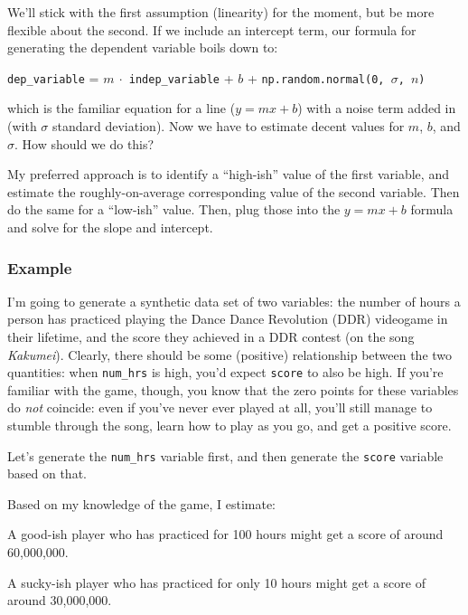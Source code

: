 We'll stick with the first assumption (linearity) for the moment, but be more
flexible about the second. If we include an intercept term, our formula for
generating the dependent variable boils down to:

\begin{center}
\texttt{dep\_variable} = $m \ \cdot$ \texttt{indep\_variable}
+ $b$ + \texttt{np.random.normal(0, $\sigma$, $n$)}
\end{center}

which is the familiar equation for a line ($y=mx+b$) with a noise term added
in (with $\sigma$ standard deviation). Now we have to estimate decent values
for $m$, $b$, and $\sigma$. How should we do this?

\medskip

My preferred approach is to identify a ``high-ish'' value of the first
variable, and estimate the roughly-on-average corresponding value of the
second variable. Then do the same for a ``low-ish'' value. Then, plug those
into the $y=mx+b$ formula and solve for the slope and intercept.

\subsubsection{Example}

I'm going to generate a synthetic data set of two variables: the number of
hours a person has practiced playing the Dance Dance Revolution (DDR)
videogame in their lifetime, and the score they achieved in a DDR contest (on
the song \textit{Kakumei}). Clearly, there should be some (positive)
relationship between the two quantities: when \texttt{num\_hrs} is high, you'd
expect \texttt{score} to also be high. If you're familiar with the game,
though, you know that the zero points for these variables do \textit{not}
coincide: even if you've never ever played at all, you'll still manage to
stumble through the song, learn how to play as you go, and get a positive
score.

Let's generate the \texttt{num\_hrs} variable first, and then generate the
\texttt{score} variable based on that.

Based on my knowledge of the game, I estimate:
\begin{compactitem}
\item A good-ish player who has practiced for 100 hours might get a score of
around 60,000,000.
\item A sucky-ish player who has practiced for only 10 hours might get a score
of around 30,000,000.
\end{compactitem}

